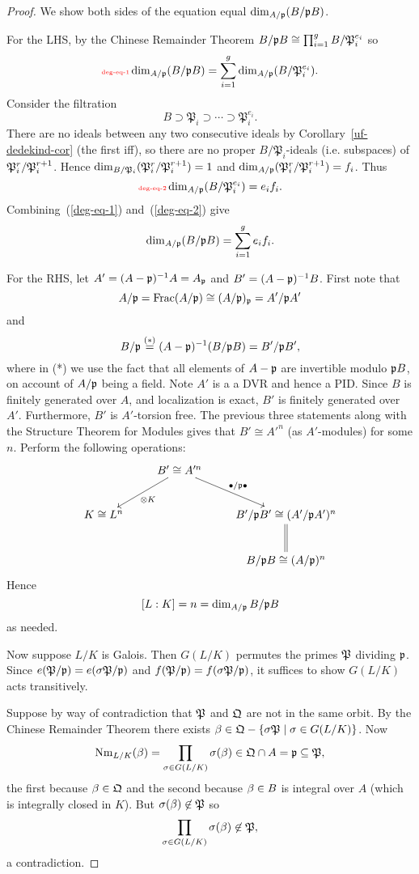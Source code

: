 \begin{proof}
We show both sides of the equation equal $\dim_{A/\mathfrak{p}}(B/\mathfrak{p} B)$.

For the LHS, by the Chinese Remainder Theorem $B/\mathfrak{p} B\cong \prod_{i=1}^g B/\mathfrak P_i^{e_i}$ so
\begin{equation}\llabel{deg-eq-1}
\dim_{A/\mfp}(B/\mfp B)=\sum_{i=1}^g \dim_{A/\mfp}(B/\mathfrak P_i^{e_i}).
\end{equation}
Consider the filtration
\[
B\supset \mathfrak P_i\supset\cdots \supset \mathfrak P_i^{e_i}.
\]
There are no ideals between any two consecutive ideals by Corollary~\ref{uf-dedekind-cor} (the first iff), so there are no proper $B/\mathfrak P_i$-ideals (i.e. subspaces) of $\mathfrak{P}_i^r/\mathfrak{P}_i^{r+1}$. Hence $\dim_{B/\mathfrak P_i}(\mathfrak{P}_i^r/\mathfrak{P}_i^{r+1})=1$ and $\dim_{A/\mathfrak {\mathfrak{p}}}(\mathfrak{P}_i^r/\mathfrak{P}_i^{r+1})=f_i$. Thus
\begin{equation}\llabel{deg-eq-2}
 \dim_{A/\mfp}(B/\mathfrak P_i^{e_i})=e_if_i.
\end{equation}
Combining~(\ref{deg-eq-1}) and~(\ref{deg-eq-2}) give
\[
\dim_{A/\mathfrak{p}}(B/\mathfrak{p} B)=\sum_{i=1}^g e_if_i.
\]

For the RHS, let $A'=(A-\mathfrak{p})^{-1}A=A_{\mathfrak{p}}$ and $B'=(A-\mathfrak{p})^{-1}B$. First note that 
\[A/\mathfrak{p}=\operatorname{Frac}(A/\mathfrak{p})\cong (A/\mathfrak{p})_{\mathfrak{p}}=A'/\mathfrak{p} A'\]
and 
\[B/\mathfrak{p}\stackrel{(*)}{=}(A-\mathfrak{p})^{-1}(B/\mathfrak{p} B)=B'/\mathfrak{p} B',\]
where in (*) we use the fact that all elements of $A-\mathfrak{p}$ are invertible modulo $\mathfrak{p} B$, on account of $A/\mathfrak{p}$ being a field. 
Note $A'$ is a a DVR and hence a PID. Since $B$ is finitely generated over $A$, and localization is exact, $B'$ is finitely generated over $A'$. Furthermore, $B'$ is $A'$-torsion free. The previous three statements along with the Structure Theorem for Modules gives that $B'\cong A'^n$ (as $A'$-modules) for some $n$. %
Perform the following operations:
\[
\xymatrix{
&B'\cong A'^n\ar^{\ot K}[ld]\ar^{\bullet/\mfp\bullet}[rd]&\\
K\cong L^n && B'/\mfp B'\cong (A'/\mfp A')^n\ar@{=}[d]\\
&& B/\mfp B\cong (A/\mfp)^n
}
\]
Hence
\[
[L:K]=n=\dim_{A/\mathfrak{p}} B/\mathfrak{p} B
\]
as needed.

Now suppose $L/K$ is Galois. Then $G(L/K)$ permutes the primes $\mathfrak{P}$ dividing $\mathfrak{p}$. %
Since $e(\mathfrak{P}/\mathfrak{p})=e(\sigma\mathfrak{P}/\mathfrak{p})$ and $f(\mathfrak{P}/\mathfrak{p})=f(\sigma\mathfrak{P}/\mathfrak{p})$, it suffices to show $G(L/K)$ acts transitively.

Suppose by way of contradiction that $\mathfrak{P}$ and $\mathfrak{Q}$ are not in the same orbit. By the Chinese Remainder Theorem there exists $\beta\in \mathfrak{Q}-\{\sigma \mathfrak{P}\mid \sigma\in G(L/K)\}$. Now
\[
\operatorname{Nm}_{L/K}(\beta)=\prod_{\sigma\in G(L/K)} \sigma(\beta)\in \mathfrak{Q}\cap A=\mathfrak{p}\subseteq \mathfrak{P},
\]
the first because $\beta\in\mathfrak{Q}$ and the second because $\beta\in B$ is integral over $A$ (which is integrally closed in $K$). But $\sigma(\beta)\not\in \mathfrak{P}$ so
\[
\prod_{\sigma\in G(L/K)} \sigma(\beta)\not\in \mathfrak{P},
\]
a contradiction.
\end{proof}
